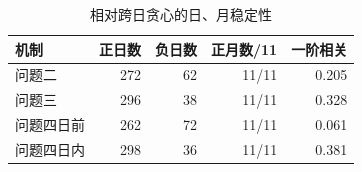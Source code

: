 \begin{table}[H]\centering\small
\caption{相对跨日贪心的日、月稳定性}
\begin{tabular}{lrrrr}\toprule
机制 & 正日数 & 负日数 & 正月数/11 & 一阶相关 \\ \midrule
问题二 & 272 & 62 & 11/11 & 0.205 \\
问题三 & 296 & 38 & 11/11 & 0.328 \\
问题四日前 & 262 & 72 & 11/11 & 0.061 \\
问题四日内 & 298 & 36 & 11/11 & 0.381 \\
\bottomrule\end{tabular}\end{table}
